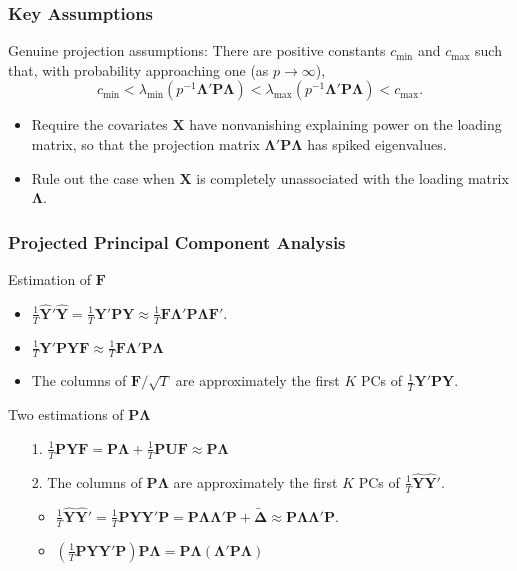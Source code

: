 \documentclass{beamer}
\newcommand{\bF}{\mathbf F}
\newcommand{\bP}{\mathbf P}
\newcommand{\bU}{\mathbf U}
\newcommand{\bX}{\mathbf X}
\newcommand{\bY}{\mathbf Y}
\newcommand{\bLambda}{\boldsymbol{\Lambda}}
\newcommand{\bDelta}{\boldsymbol{\Delta}}
\begin{document}

\begin{frame}
\frametitle{Key Assumptions}
Genuine projection assumptions: There are positive constants $c_{\text{min}}$ and $c_{\text{max}}$ such that, with probability approaching one (as $p \to \infty$),
$$c_{\text{min}} < \lambda_{\text{min}}(p^{-1}\bLambda' \bP \bLambda) < \lambda_{\text{max}}(p^{-1}\bLambda' \bP \bLambda) < c_{\text{max}}.$$ 
\begin{itemize}
	\item Require the covariates $\bX$ have nonvanishing explaining power on the loading matrix, so that the projection matrix $\bLambda' \bP \bLambda$  has spiked eigenvalues.
	\item Rule out the case when $\bX$ is completely unassociated with the loading matrix $\bLambda$.
\end{itemize}	
\end{frame}
	

\begin{frame}
\frametitle{Projected Principal Component Analysis}

Estimation of $\bF$
\begin{itemize}
	\item $\frac{1}{T}\hat{\bY}' \hat{\bY} = \frac{1}{T} \bY' \bP \bY \approx \frac{1}{T} \bF \bLambda' \bP \bLambda \bF'$.
	\item $\frac{1}{T} \bY' \bP \bY \bF\approx \frac{1}{T} \bF \bLambda' \bP \bLambda $
	\item The columns of $\bF/\sqrt{T}$ are approximately the first $K$ PCs of $\frac{1}{T} \bY' \bP \bY$.
\end{itemize}

Two estimations of $\bP\bLambda$	
\begin{itemize}
	\item[1.] $\frac{1}{T} \bP \bY \bF = \bP\bLambda + \frac{1}{T} \bP \bU \bF \approx \bP\bLambda$ 
	\item[2.] The columns of $\bP\bLambda$ are approximately the first $K$ PCs of $\frac{1}{T}\hat{\bY} \hat{\bY}'$.
	\begin{itemize}
		\item $\frac{1}{T}\hat{\bY} \hat{\bY}' = \frac{1}{T} \bP \bY  \bY' \bP = \bP \bLambda  \bLambda' \bP + \tilde{\bDelta}\approx \bP \bLambda  \bLambda' \bP$.
		\item $(\frac{1}{T} \bP \bY  \bY' \bP)\bP\bLambda = \bP\bLambda(\bLambda' \bP \bLambda)$
	\end{itemize}
\end{itemize}
\end{frame}
\end{document}
